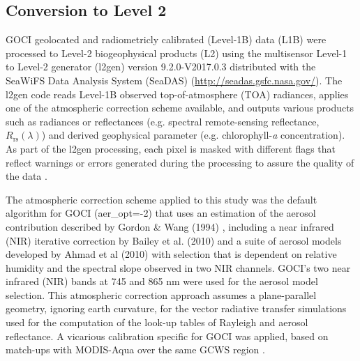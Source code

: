 \documentclass[remotesensing,article,submit,moreauthors,pdftex,10pt,a4paper]{Definitions/mdpi}
\begin{document}
\subsection{Conversion to Level 2}
GOCI geolocated and radiometricly calibrated (Level-1B) data (L1B) were processed to Level-2 biogeophysical products (L2) using the multisensor Level-1 to Level-2 generator (l2gen) version 9.2.0-V2017.0.3 distributed with the SeaWiFS Data Analysis System (SeaDAS) (\url{http://seadas.gsfc.nasa.gov/}). The l2gen code reads Level-1B observed top-of-atmosphere (TOA) radiances, applies one of the atmospheric correction scheme available, and outputs various products such as radiances or reflectances (e.g. spectral remote-sensing reflectance, $R_\text{rs}(\lambda)$) and derived geophysical parameter (e.g. chlorophyll-{\it a} concentration). As part of the l2gen processing, each pixel is masked with different flags that reflect warnings or errors generated during the processing to assure the quality of the data \cite{Bailey2006}. 


The atmospheric correction scheme applied to this study was the default algorithm for GOCI (aer\_opt=-2) that uses an estimation of the aerosol contribution described by Gordon \& Wang (1994) \cite{Gordon1994}, including a near infrared (NIR) iterative correction by Bailey et al. (2010) \cite{Bailey2010} and a suite of aerosol models developed by Ahmad et al (2010) \cite{Ahmad2010} with selection that is dependent on relative humidity and the spectral slope observed in two NIR channels. GOCI's two near infrared (NIR) bands at 745 and 865 nm were used for the aerosol model selection. This atmospheric correction approach assumes a plane-parallel geometry, ignoring earth curvature, for the vector radiative transfer simulations used for the computation of the look-up tables of Rayleigh and aerosol reflectance. A vicarious calibration specific for GOCI was applied, based on match-ups with MODIS-Aqua over the same GCWS region \cite{Concha_2018a}. 
\end{document}
